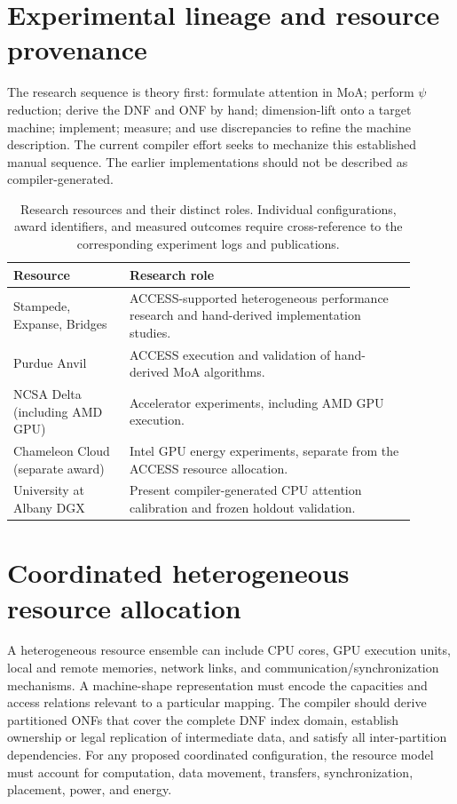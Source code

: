 \documentclass[11pt]{article}
\begin{document}
\section{Experimental lineage and resource provenance}
The research sequence is theory first: formulate attention in MoA; perform $\psi$ reduction; derive the DNF and ONF by hand; dimension-lift onto a target machine; implement; measure; and use discrepancies to refine the machine description. The current compiler effort seeks to mechanize this established manual sequence. The earlier implementations should not be described as compiler-generated.
\begin{table}[htbp]\centering\small
\caption{Research resources and their distinct roles. Individual configurations, award identifiers, and measured outcomes require cross-reference to the corresponding experiment logs and publications.}
\begin{tabular}{p{0.26\linewidth}p{0.64\linewidth}}\toprule
Resource & Research role \\\midrule
Stampede, Expanse, Bridges & ACCESS-supported heterogeneous performance research and hand-derived implementation studies.\\
Purdue Anvil & ACCESS execution and validation of hand-derived MoA algorithms.\\
NCSA Delta (including AMD GPU) & Accelerator experiments, including AMD GPU execution.\\
Chameleon Cloud (separate award) & Intel GPU energy experiments, separate from the ACCESS resource allocation.\\
University at Albany DGX & Present compiler-generated CPU attention calibration and frozen holdout validation.\\
\bottomrule\end{tabular}\end{table}

\section{Coordinated heterogeneous resource allocation}
A heterogeneous resource ensemble can include CPU cores, GPU execution units, local and remote memories, network links, and communication/synchronization mechanisms. A machine-shape representation must encode the capacities and access relations relevant to a particular mapping. The compiler should derive partitioned ONFs that cover the complete DNF index domain, establish ownership or legal replication of intermediate data, and satisfy all inter-partition dependencies. For any proposed coordinated configuration, the resource model must account for computation, data movement, transfers, synchronization, placement, power, and energy.
\end{document}
